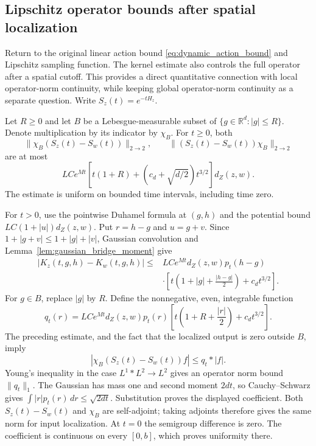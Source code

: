 \subsection{Lipschitz operator bounds after spatial localization}
Return to the original linear action bound
\eqref{eq:dynamic_action_bound} and Lipschitz sampling function.
The kernel estimate also controls the full operator after a spatial
cutoff. This provides a direct quantitative connection with local
operator-norm continuity, while keeping global operator-norm continuity
as a separate question. Write $S_z(t)=e^{-tH_z}$.

\begin{proposition}
\label{prop:dynamic_local_operator_lipschitz}
Let $R\geq0$ and let $B$ be a Lebesgue-measurable subset of
$\{g\in\mathbb R^d:|g|\leq R\}$. Denote multiplication by its
indicator by $\chi_B$. For $t\geq0$, both
\[
\|\chi_B(S_z(t)-S_w(t))\|_{2\to2},\qquad
\|(S_z(t)-S_w(t))\chi_B\|_{2\to2}
\]
are at most
\[
LC e^{Mt}
 \left[t(1+R)+\left(c_d+\sqrt{d/2}\right)t^{3/2}\right]d_Z(z,w).
\]
The estimate is uniform on bounded time intervals, including time zero.
\end{proposition}
\Proof
For $t>0$, use the pointwise Duhamel formula at $(g,h)$ and the
potential bound $LC(1+|u|)d_Z(z,w)$. Put $r=h-g$ and $u=g+v$.
Since $1+|g+v|\leq1+|g|+|v|$, Gaussian convolution and
Lemma~\ref{lem:gaussian_bridge_moment} give
\[
\begin{split}
|K_z(t,g,h)-K_w(t,g,h)|
\leq{}&LC e^{Mt}d_Z(z,w)p_t(h-g)\\
&\cdot\left[t\left(1+|g|+\frac{|h-g|}{2}\right)
                         +c_dt^{3/2}\right].
\end{split}
\]
For $g\in B$, replace $|g|$ by $R$. Define the nonnegative,
even, integrable function
\[
q_t(r)=LC e^{Mt}d_Z(z,w)p_t(r)
 \left[t\left(1+R+\frac{|r|}{2}\right)+c_dt^{3/2}\right].
\]
The preceding estimate, and the fact that the localized output is
zero outside $B$, imply
\[
|\chi_B(S_z(t)-S_w(t))f|\leq q_t*|f|.
\]
Young's inequality in the case $L^1*L^2\to L^2$ gives an operator
norm bound $\|q_t\|_1$. The Gaussian has mass one and second
moment $2dt$, so Cauchy--Schwarz gives
$\int|r|p_t(r)\,dr\leq\sqrt{2dt}$. Substitution proves the
displayed coefficient. Both $S_z(t)-S_w(t)$ and $\chi_B$ are
self-adjoint; taking adjoints therefore gives the same norm for
input localization. At $t=0$ the semigroup difference is zero.
The coefficient is continuous on every $[0,b]$, which proves
uniformity there.
\Done

